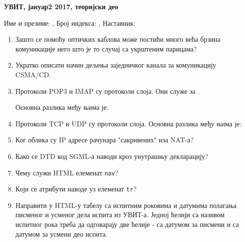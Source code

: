 \documentclass[a4paper]{article}
\begin{document}
\begin{center}
\textbf{УВИТ, јануар2 2017, теоријски део}  
\end{center}
Име и презиме: \hrulefill, Број индекса: \hrulefill, Наставник: \hrulefill
\begin{enumerate}

\item Зашто се помоћу оптичких каблова може постићи много већа брзина комуникације него што је то случај 
са укрштеним парицама? \hrulefill

\hrulefill


\item Укратко описати начин дељења заједничког канала за комуникацију CSMA/CD. \hrulefill

\hrulefill

\hrulefill


\item Протоколи POP3 и IMAP су протоколи \hrulefill слоја. Они служе за  \hrulefill. 

Основна разлика међу њима је:\hrulefill

\hrulefill

\item Протоколи TCP и UDP су протоколи \hrulefill слоја. Основна разлика међу њима је:

\hrulefill


\item Ког облика су IP адресе рачунара "сакривених" иза NAT-а? \hrulefill

\hrulefill


\item Како се DTD код SGML-а наводи кроз унутрашњу декларацију? \hrulefill

\hrulefill

\hrulefill


\item Чему служи HTML елеменат \verb|nav|? \hrulefill

\hrulefill

\item Који се атрибути наводе уз елеменат \verb|tr|? \hrulefill

\hrulefill


\item Направити у HTML-у табелу са испитним роковима и датумима полагања писменог и усменог дела испита из УВИТ-а. 
Једној ћелији са називом испитног рока треба да одговарају две ћелије - са датумом за писмени и са датумом 
за усмени део испита. \hrulefill


\end{enumerate}
\end{document}
